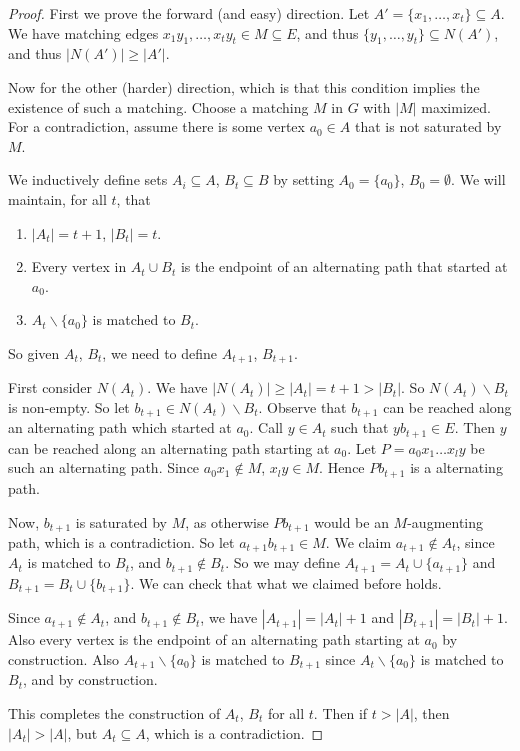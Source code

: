 \begin{proof}
	First we prove the forward (and easy) direction. Let $A' = \{x_1, \dots, x_t \} \subseteq A$. We have matching edges $x_1 y_1, \dots, x_t y_t \in M \subseteq E$, and thus $\{y_1, \dots, y_t\} \subseteq N(A')$, and thus $|N(A')| \geq |A'|$.

	Now for the other (harder) direction, which is that this condition implies the existence of such a matching. Choose a matching $M$ in $G$ with $|M|$ maximized. For a contradiction, assume there is some vertex $a_0 \in A$ that is not saturated by $M$.

	We inductively define sets $A_i \subseteq A$, $B_t \subseteq B$ by setting $A_0 = \{a_0\}$, $B_0 = \emptyset$. We will maintain, for all $t$, that
	\begin{enumerate}
		\item $|A_t| = t + 1$, $|B_t| = t$.
		\item Every vertex in $A_t \cup B_t$ is the endpoint of an alternating path that started at $a_0$. 
		\item $A_t \backslash \{a_0\}$ is matched to $B_t$.
	\end{enumerate}
	So given $A_t$, $B_t$, we need to define $A_{t + 1}$, $B_{t + 1}$.

	First consider $N(A_t)$. We have $|N(A_t)| \geq |A_t| = t + 1 > |B_t|$. So $N(A_t) \backslash B_t$ is non-empty. So let $b_{t + 1} \in N(A_t) \backslash B_t$. Observe that $b_{t + 1}$ can be reached along an alternating path which started at $a_0$. Call $y \in A_t$ such that $yb_{t + 1} \in E$. Then $y$ can be reached along an alternating path starting at $a_0$. Let $P = a_0 x_1 \dots x_l y$ be such an alternating path. Since $a_0x_1 \not \in M$, $x_l y \in M$. Hence $Pb_{t + 1}$ is a alternating path.

	Now, $b_{t + 1}$ is saturated by $M$, as otherwise $Pb_{t + 1}$ would be an $M$-augmenting path, which is a contradiction. So let $a_{t+1}b_{t+1} \in M$. We claim $a_{t + 1} \not \in A_t$, since $A_t$ is matched to $B_t$, and $b_{t + 1} \not \in B_t$. So we may define $A_{t + 1} = A_t \cup \{a_{t + 1}\}$ and $B_{t + 1} = B_t \cup \{b_{t + 1}\}$. We can check that what we claimed before holds. 

	Since $a_{t + 1} \not \in A_t$, and $b_{t + 1} \not \in B_t$, we have $|A_{t +1}| = |A_t| + 1$ and $|B_{t + 1}| = |B_t| + 1$. Also every vertex is the endpoint of an alternating path starting at $a_0$ by construction. Also $A_{t + 1}\backslash\{a_0\}$ is matched to $B_{t + 1}$ since $A_t\backslash\{a_0\}$ is matched to $B_t$, and by construction.

	This completes the construction of $A_t$, $B_t$ for all $t$. Then if $t > |A|$, then $|A_t| > |A|$, but $A_t \subseteq A$, which is a contradiction.
\end{proof}

